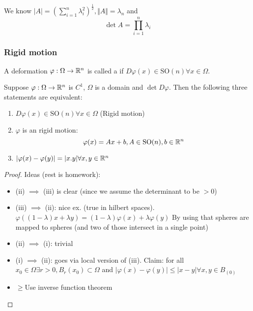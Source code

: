 We know \(|A|=(\sum_{i=1}^n \lambda_i^2)^\frac{1}{2},\Vert A \Vert = \lambda_n\) and 
\[\det A=\prod_{i=1}^n \lambda_i\]

\subsubsection*{Rigid motion}


\begin{definition}\label{def:1.6}
    A deformation \(\varphi:\Omega\to \mathbb{R}^n\) is called a  if \(D\varphi(x)\in \text{SO}(n)\forall x\in \Omega\).
\end{definition}

\begin{theorem}[Liouville]\label{thm:1.7}
    Suppose \(\varphi:\Omega\to\mathbb{R}^n\) is \(C^1\), \(\Omega\) is a domain and \(\det D\varphi\). Then the following three statements are equivalent:
    \begin{enumerate}
        \item \(D\varphi(x)\in\text{SO}(n)\forall x\in \Omega\) (Rigid motion)
        \item \(\varphi\) is an  rigid motion: \[\varphi(x)=Ax+b, A\in \text{SO}(n),b\in \mathbb{R}^n\]
        \item \(|\varphi(x)-\varphi(y)|=|x.y|\forall x,y\in \mathbb{R}^n\)
    \end{enumerate} 
\end{theorem}

\begin{proof}
    Ideas (rest is homework):

    \begin{itemize}
        \item (ii) \(\implies\) (iii) is clear (since we assume the determinant to be $>0$)
        \item (iii) \(\implies\) (ii): nice ex. (true in hilbert spaces). \(\varphi((1-\lambda)x+\lambda y)=(1-\lambda)\varphi(x)+\lambda\varphi(y)\) By using that spheres are mapped to spheres (and two of those intersect in a single point)
        \item (ii) \(\implies\) (i): trivial
        \item (i) \(\implies\) (ii): goes via local version of (iii). Claim: for all \(x_0\in\Omega\exists r>0, B_r(x_0)\subset \Omega\) and \(|\varphi(x)-\varphi(y)|\leq |x-y|\forall x,y\in B_(0)\)
        \item \(\geq \)Use inverse function theorem 
    \end{itemize}
\end{proof}

